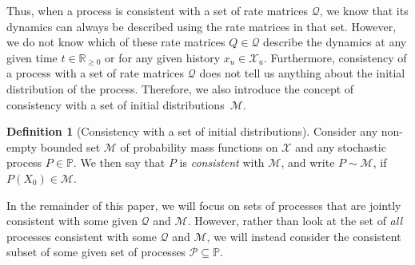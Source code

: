 \documentclass[10pt,a4paper]{paper}
\theoremstyle{definition}
\newtheorem{definition}{Definition}
\newcommand{\reals}{\mathbb{R}}
\newcommand{\realsnonneg}{\reals_{\geq 0}}
\newcommand{\states}{\mathcal{X}}
\newcommand{\processes}{\mathbb{P}}
\newcommand{\rateset}{\mathcal{Q}}
\begin{document}
Thus, when a process is consistent with a set of rate matrices $\rateset$, we know that its dynamics can always be described using the rate matrices in that set. However, we do not know which of these rate matrices $Q\in\rateset$ describe the dynamics at any given time $t\in\realsnonneg$ or for any given history $x_u\in\states_u$. Furthermore, consistency of a process with a set of rate matrices $\rateset$ does not tell us anything about the initial distribution of the process. %
Therefore, we also introduce the concept of consistency with a set of initial distributions~$\mathcal{M}$.

\begin{definition}[Consistency with a set of initial distributions]\label{def:consistent_process_initialdistribution}
Consider any non-empty bounded set $\mathcal{M}$ of probability mass functions on $\states$ and any stochastic process $P\in\processes$. We then say that $P$ is \emph{consistent} with $\mathcal{M}$, and write $P\sim\mathcal{M}$, if $P(X_0)\in\mathcal{M}$.
\end{definition}

In the remainder of this paper, we will focus on sets of processes that are jointly consistent with some given $\rateset$ and $\mathcal{M}$. However, rather than look at the set of \emph{all} processes consistent with some $\rateset$ and $\mathcal{M}$, we will instead consider the consistent subset of some given set of processes $\mathcal{P}\subseteq\processes$.

\end{document}
